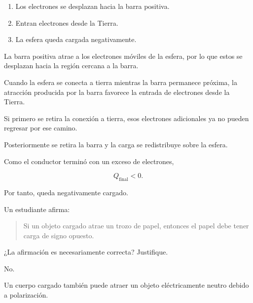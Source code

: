 \begin{respuesta}

\begin{enumerate}
    \item Los electrones se desplazan hacia la barra positiva.
    \item Entran electrones desde la Tierra.
    \item La esfera queda cargada negativamente.
\end{enumerate}

\end{respuesta}

\begin{explicacion}

La barra positiva atrae a los electrones móviles de la esfera, por lo que
estos se desplazan hacia la región cercana a la barra.

Cuando la esfera se conecta a tierra mientras la barra permanece próxima,
la atracción producida por la barra favorece la entrada de electrones desde
la Tierra.

Si primero se retira la conexión a tierra, esos electrones adicionales ya no
pueden regresar por ese camino.

Posteriormente se retira la barra y la carga se redistribuye sobre la esfera.

Como el conductor terminó con un exceso de electrones,

\[
\boxed{
Q_{\text{final}}<0
}.
\]

Por tanto, queda negativamente cargado.

\end{explicacion}



\begin{ejercicio}

Un estudiante afirma:

\begin{quote}
Si un objeto cargado atrae un trozo de papel, entonces el papel debe tener
carga de signo opuesto.
\end{quote}

¿La afirmación es necesariamente correcta? Justifique.

\end{ejercicio}

\begin{respuesta}

No.

Un cuerpo cargado también puede atraer un objeto eléctricamente neutro debido
a polarización.

\end{respuesta}

